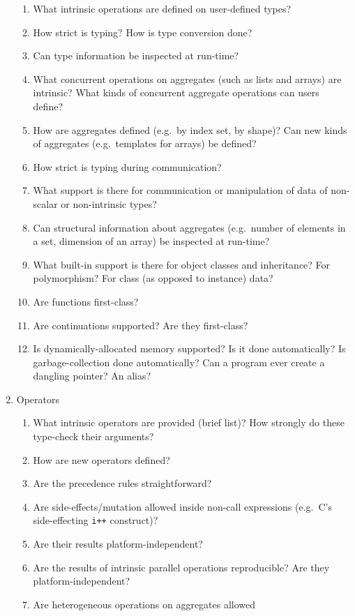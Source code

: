 \begin{enumerate}
\begin{enumerate}
  \item What intrinsic operations are defined on user-defined types?
  \item How strict is typing?
	How is type conversion done?
  \item Can type information be inspected at run-time?
  \item What concurrent operations on aggregates
	(such as lists and arrays) are intrinsic?
	What kinds of concurrent aggregate operations can users define?
  \item How are aggregates defined (e.g.\ by index set, by shape)?
	Can new kinds of aggregates (e.g.\ templates for arrays)
	be defined?
  \item How strict is typing during communication?
  \item What support is there for communication or manipulation
	of data of non-scalar or non-intrinsic types?
  \item Can structural information about aggregates
	(e.g.\ number of elements in a set, dimension of an array)
	be inspected at run-time?
  \item What built-in support is there for object classes and inheritance?
	For polymorphism?
	For class (as opposed to instance) data?
  \item Are functions first-class?
  \item Are continuations supported?  Are they first-class?
  \item Is dynamically-allocated memory supported?
	Is it done automatically?
	Is garbage-collection done automatically?
	Can a program ever create a dangling pointer?
	An alias?
  \end{enumerate}
\item Operators
  \begin{enumerate}
  \item What intrinsic operators are provided (brief list)?
	How strongly do these type-check their arguments?
  \item How are new operators defined?
  \item Are the precedence rules straightforward?
  \item Are side-effects/mutation allowed inside non-call expressions
	(e.g.\ C's side-effecting \verb`i++` construct)?
  \item Are their results platform-independent?
  \item Are the results of intrinsic parallel operations reproducible?
	Are they platform-independent?
  \item Are heterogeneous operations on aggregates allowed

\end{enumerate}
\end{enumerate}
